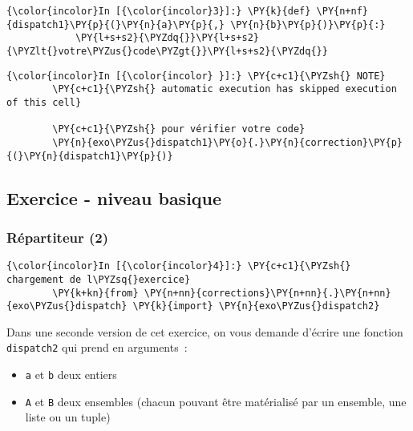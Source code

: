     \begin{Verbatim}[commandchars=\\\{\}]
{\color{incolor}In [{\color{incolor}3}]:} \PY{k}{def} \PY{n+nf}{dispatch1}\PY{p}{(}\PY{n}{a}\PY{p}{,} \PY{n}{b}\PY{p}{)}\PY{p}{:}
            \PY{l+s+s2}{\PYZdq{}}\PY{l+s+s2}{\PYZlt{}votre\PYZus{}code\PYZgt{}}\PY{l+s+s2}{\PYZdq{}}
\end{Verbatim}


    \begin{Verbatim}[commandchars=\\\{\}]
{\color{incolor}In [{\color{incolor} }]:} \PY{c+c1}{\PYZsh{} NOTE}
        \PY{c+c1}{\PYZsh{} automatic execution has skipped execution of this cell}
        
        \PY{c+c1}{\PYZsh{} pour vérifier votre code}
        \PY{n}{exo\PYZus{}dispatch1}\PY{o}{.}\PY{n}{correction}\PY{p}{(}\PY{n}{dispatch1}\PY{p}{)}
\end{Verbatim}


    \hypertarget{exercice---niveau-basique}{%
\subsection{Exercice - niveau basique}\label{exercice---niveau-basique}}

    \hypertarget{ruxe9partiteur-2}{%
\subsubsection{Répartiteur (2)}\label{ruxe9partiteur-2}}

    \begin{Verbatim}[commandchars=\\\{\}]
{\color{incolor}In [{\color{incolor}4}]:} \PY{c+c1}{\PYZsh{} chargement de l\PYZsq{}exercice}
        \PY{k+kn}{from} \PY{n+nn}{corrections}\PY{n+nn}{.}\PY{n+nn}{exo\PYZus{}dispatch} \PY{k}{import} \PY{n}{exo\PYZus{}dispatch2}
\end{Verbatim}


    Dans une seconde version de cet exercice, on vous demande d'écrire une
fonction \texttt{dispatch2} qui prend en arguments~:

\begin{itemize}
\tightlist
\item
  \texttt{a} et \texttt{b} deux entiers
\item
  \texttt{A} et \texttt{B} deux ensembles (chacun pouvant être
  matérialisé par un ensemble, une liste ou un tuple)
\end{itemize}

